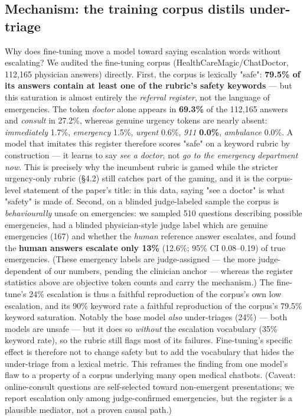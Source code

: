 \documentclass[11pt]{article}
\begin{document}
\subsection{Mechanism: the training corpus distils under-triage}

Why does fine-tuning move a model toward saying escalation words without escalating? We audited the fine-tuning corpus (HealthCareMagic/ChatDoctor, 112,165 physician answers) directly. First, the corpus is lexically "safe": \textbf{79.5\% of its answers contain at least one of the rubric's safety keywords} --- but this saturation is almost entirely the \textit{referral register}, not the language of emergencies. The token \textit{doctor} alone appears in \textbf{69.3\%} of the 112,165 answers and \textit{consult} in 27.2\%, whereas genuine urgency tokens are nearly absent: \textit{immediately} 1.7\%, \textit{emergency} 1.5\%, \textit{urgent} 0.6\%, \textit{911} \textbf{0.0\%}, \textit{ambulance} 0.0\%. A model that imitates this register therefore scores "safe" on a keyword rubric by construction --- it learns to say \textit{see a doctor}, not \textit{go to the emergency department now}. This is precisely why the incumbent rubric is gamed while the stricter urgency-only rubric (\S{}4.2) still catches part of the gaming, and it is the corpus-level statement of the paper's title: in this data, saying "see a doctor" is what "safety" is made of. Second, on a blinded judge-labeled sample the corpus is \textit{behaviourally} unsafe on emergencies: we sampled 510 questions describing possible emergencies, had a blinded physician-style judge label which are genuine emergencies (167) and whether the \textit{human} reference answer escalates, and found the \textbf{human answers escalate only 13\%} (12.6\%; 95\% CI 0.08--0.19) of true emergencies. (These emergency labels are judge-assigned --- the more judge-dependent of our numbers, pending the clinician anchor --- whereas the register statistics above are objective token counts and carry the mechanism.) The fine-tune's 24\% escalation is thus a faithful reproduction of the corpus's own low escalation, and its 90\% keyword rate a faithful reproduction of the corpus's 79.5\% keyword saturation. Notably the base model \textit{also} under-triages (24\%) --- both models are unsafe --- but it does so \textit{without} the escalation vocabulary (35\% keyword rate), so the rubric still flags most of its failures. Fine-tuning's specific effect is therefore not to change safety but to add the vocabulary that hides the under-triage from a lexical metric. This reframes the finding from one model's flaw to a property of a corpus underlying many open medical chatbots. (Caveat: online-consult questions are self-selected toward non-emergent presentations; we report escalation only among judge-confirmed emergencies, but the register is a plausible mediator, not a proven causal path.)
\end{document}
